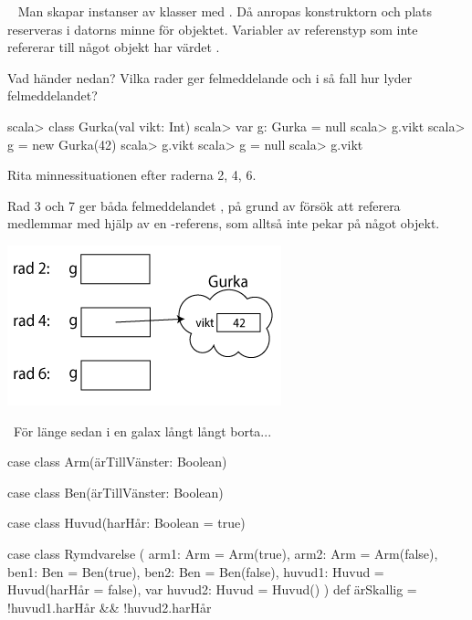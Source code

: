 \QUESTEND



\clearpage

\ExtraTasks %




\QUESTBEGIN

\Task  \what~  Man skapar instanser av klasser med . Då anropas konstruktorn och plats reserveras i datorns minne för objektet. Variabler av referenstyp som inte refererar till något objekt har värdet .

\Subtask Vad händer nedan? Vilka rader ger felmeddelande och i så fall hur lyder felmeddelandet?

\begin{REPL}
scala> class Gurka(val vikt: Int)
scala> var g: Gurka = null
scala> g.vikt
scala> g = new Gurka(42)
scala> g.vikt
scala> g = null
scala> g.vikt
\end{REPL}

\Subtask Rita minnessituationen efter raderna 2, 4, 6.

\SOLUTION


\TaskSolved \what


\SubtaskSolved  Rad 3 och 7 ger båda felmeddelandet ,  på grund av försök att referera medlemmar med hjälp av en -referens, som alltså inte pekar på något objekt.

\SubtaskSolved  \includegraphics[scale=0.6]{../img/w06-solutions/1b}


\QUESTEND



\QUESTBEGIN

\Task  \what~För länge sedan i en galax långt långt borta...

\begin{Code}
case class Arm(ärTillVänster: Boolean)

case class Ben(ärTillVänster: Boolean)

case class Huvud(harHår: Boolean = true)

case class Rymdvarelse (
      arm1:   Arm   = Arm(true),
      arm2:   Arm   = Arm(false),
      ben1:   Ben   = Ben(true),
      ben2:   Ben   = Ben(false),
      huvud1: Huvud = Huvud(harHår = false),
  var huvud2: Huvud = Huvud()
) {
  def ärSkallig = !huvud1.harHår && !huvud2.harHår
}
\end{Code}

